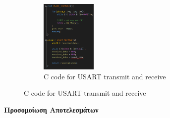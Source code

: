 \documentclass{article}
\begin{document}
\begin{figure}[h!]
		\begin{subfigure}[t]{0.5\textwidth}
			\centering
			\includegraphics[height=3.5cm, width=\linewidth]{./results/lab5_usart_receive_transmit.png}
			\caption{C code for USART transmit and receive}
		\end{subfigure}	
	\end{figure}

	\noindent
	\textbf{Προσομοίωση Αποτελεσμάτων} \\
	
\end{document}

